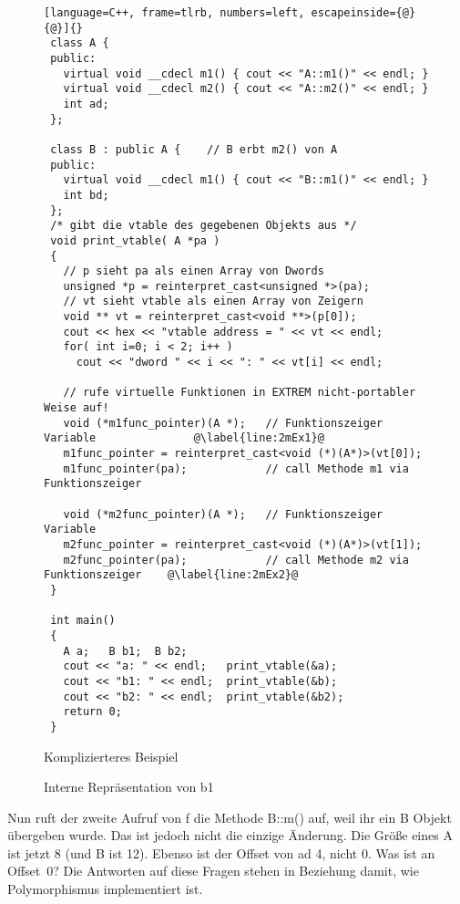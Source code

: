 \begin{figure}[tp]
\begin{lstlisting}[language=C++, frame=tlrb, numbers=left, escapeinside={@}{@}]{}
 class A {
 public:
   virtual void __cdecl m1() { cout << "A::m1()" << endl; }
   virtual void __cdecl m2() { cout << "A::m2()" << endl; }
   int ad;
 };

 class B : public A {    // B erbt m2() von A
 public:
   virtual void __cdecl m1() { cout << "B::m1()" << endl; }
   int bd;
 };
 /* gibt die vtable des gegebenen Objekts aus */
 void print_vtable( A *pa )
 {
   // p sieht pa als einen Array von Dwords
   unsigned *p = reinterpret_cast<unsigned *>(pa);
   // vt sieht vtable als einen Array von Zeigern
   void ** vt = reinterpret_cast<void **>(p[0]);
   cout << hex << "vtable address = " << vt << endl;
   for( int i=0; i < 2; i++ )
     cout << "dword " << i << ": " << vt[i] << endl;

   // rufe virtuelle Funktionen in EXTREM nicht-portabler Weise auf!
   void (*m1func_pointer)(A *);   // Funktionszeiger Variable               @\label{line:2mEx1}@
   m1func_pointer = reinterpret_cast<void (*)(A*)>(vt[0]);
   m1func_pointer(pa);            // call Methode m1 via Funktionszeiger

   void (*m2func_pointer)(A *);   // Funktionszeiger Variable
   m2func_pointer = reinterpret_cast<void (*)(A*)>(vt[1]);
   m2func_pointer(pa);            // call Methode m2 via Funktionszeiger    @\label{line:2mEx2}@
 }

 int main()
 {
   A a;   B b1;  B b2;
   cout << "a: " << endl;   print_vtable(&a);
   cout << "b1: " << endl;  print_vtable(&b);
   cout << "b2: " << endl;  print_vtable(&b2);
   return 0;
 }
\end{lstlisting}
\caption{ Komplizierteres Beispiel \label{fig:2mEx}}
\end{figure}


\begin{figure}[tp]
\centering

\caption{Interne Repr\"{a}sentation von {\code b1} \label{fig:vtable}}
\end{figure}

Nun ruft der zweite Aufruf von {\code f} die Methode {\code B::m()}
auf, weil ihr ein {\code B} Objekt \"{u}bergeben wurde. Das ist jedoch
nicht die einzige \"{A}nderung. Die Gr\"{o}{\ss}e eines {\code A} ist jetzt 8
(und {\code B} ist 12). Ebenso ist der Offset von {\code ad} 4,
nicht 0. Was ist an Offset~0? Die Antworten auf diese Fragen stehen
in Beziehung damit, wie Polymorphismus implementiert ist.

